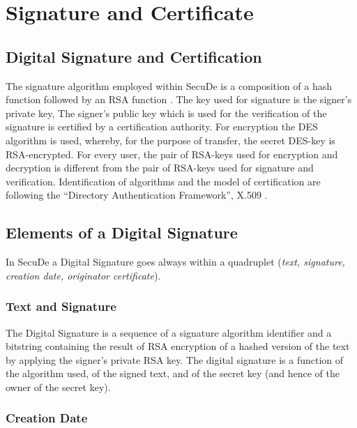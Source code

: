 \section{Signature and Certificate}
\thispagestyle{myheadings}
\label{sigandcert}

\subsection{Digital Signature and Certification}
\label{sc-dsc}

The signature algorithm employed within
SecuDe
is a composition of a hash function followed by an RSA function
\cite{riv1} \cite{ttt1} \cite{ttt2} \cite{ttt3}.
The key used for signature is the signer's private key,
The signer's public key which is used for the verification of the signature
is certified by a certification authority.
For encryption the DES algorithm is used,
whereby, for the purpose of transfer, the secret DES-key is RSA-encrypted.
For every user,
the pair of RSA-keys used for encryption and decryption is
different from the pair of RSA-keys used for signature and verification.
Identification of algorithms and
the model of certification are following the
``Directory Authentication Framework'', X.509 \cite{cci4}.

\subsection{Elements of a Digital Signature}
\label{sc-eds}

In SecuDe
a Digital Signature goes always within a quadruplet
({\em text, signature, creation date, ori\-gi\-na\-tor cer\-ti\-fi\-cate}).

\subsubsection{Text and Signature}
\label{sc-ts}

The Digital Signature is a sequence of a signature algorithm identifier
and a bitstring containing the result of RSA encryption
of a hashed version of the text
by applying the signer's private RSA key.
The digital signature is a function of the algorithm used,
of the signed text,
and of the secret key (and hence of the owner of the secret key).

\subsubsection{Creation Date}
\label{sc-cd}


